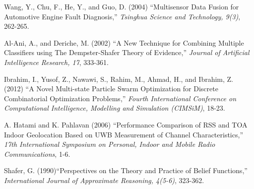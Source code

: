 \documentclass[12pt]{uthesis-v12}  %
\begin{document}
\begin{thebibliography}{00}

Wang, Y., Chu, F., He, Y., and Guo, D. (2004) ``Multisensor Data Fusion for Automotive Engine Fault Diagnosis,'' {\it Tsinghua Science and Technology, 9(3)}, 262-265.

Al-Ani, A., and Deriche, M. (2002) ``A New Technique for Combining Multiple Classifiers using The Dempster-Shafer Theory of Evidence,'' {\it Journal of Artificial Intelligence Research, 17}, 333-361.


Ibrahim, I., Yusof, Z., Nawawi, S., Rahim, M., Ahmad, H., and Ibrahim, Z. (2012) ``A Novel Multi-state Particle Swarm Optimization for Discrete Combinatorial Optimization Problems,'' {\it Fourth International Conference on Computational Intelligence, Modelling and Simulation (CIMSiM)}, 18-23.




A. Hatami and K. Pahlavan (2006) ``Performance Comparison of RSS and TOA Indoor Geolocation Based on UWB Measurement of Channel Characteristics,'' {\it 17th International Symposium on Personal, Indoor and Mobile Radio Communications}, 1-6.

Shafer, G. (1990)``Perspectives on the Theory and Practice of Belief Functions,'' {\it International Journal of Approximate Reasoning, 4(5-6)}, 323-362.


\end{thebibliography}
\end{document}
